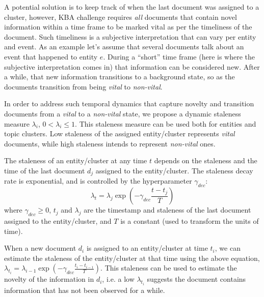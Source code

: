 \documentclass{sig-alternate}
\begin{document}
A potential solution is to keep track of when the last document was assigned to a cluster, however, KBA challenge requires \emph{all} documents that contain novel information within a time frame to be marked vital as per the timeliness of the document.
Such timeliness is a subjective interpretation that can vary per entity and event. 
As an example let's assume that several documents talk about an event that happened to entity $e$. 
During a ``short'' time frame (here is where the subjective interpretation comes in) that information can be considered new. 
After a while, that new information transitions to a background state, so as the documents transition from being \emph{vital} to \emph{non-vital}.


In order to address such temporal dynamics that capture novelty and transition documents from a \emph{vital} to a \emph{non-vital} state, we propose a dynamic staleness measure $\lambda_i$, $0 < \lambda_i \leq 1$. 
This staleness measure can be used both for entities and topic clusters.
Low staleness of the assigned entity/cluster represents \emph{vital} documents, while high staleness intends to represent \emph{non-vital} ones.

The staleness of an entity/cluster at any time $t$ depends on the staleness and the time of the last document $d_j$ assigned to the entity/cluster. %
The staleness decay rate is exponential, and is controlled by the hyperparameter $\gamma_{dec}$:
\begin{equation}
\label{decrease}
\lambda_t = \lambda_{j} \exp{(-\gamma_{dec} \frac{t-t_j}{T})}
\end{equation}
where $\gamma_{dec} \geq 0$, $t_j$ and $\lambda_j$ are the timestamp and staleness of the last document assigned to the entity/cluster, and $T$ is a constant (used to transform the units of time). %

When a new document $d_i$ is assigned to an entity/cluster at time $t_i$, we can estimate the staleness of the entity/cluster at that time using the above equation, $\lambda_{t_i} = \lambda_{i-1} \exp{(-\gamma_{dec} \frac{t_i-t_{i-1}}{T})}$.
This staleness can be used to estimate the novelty of the information in $d_i$, i.e. a low $\lambda_{t_i}$ suggests the document contains information that has not been observed for a while.
\end{document}
